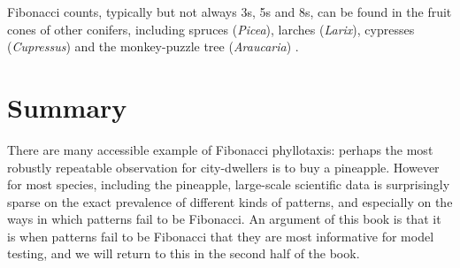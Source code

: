 Fibonacci counts, typically but not always 3s, 5s and 8s, can be found in the fruit cones of other conifers, including spruces (\textit{Picea}), larches (\textit{Larix}),  cypresses (\textit{Cupressus}) \cite{fierzAberrantPhyllotacticPatterns2015} and the monkey-puzzle tree (\textit{Araucaria}) \cite{churchRelationPhyllotaxisMechanical1904}. 




 \section{Summary}
 There are many accessible example of Fibonacci phyllotaxis: perhaps the most robustly repeatable observation for city-dwellers is to buy a pineapple. However for most species, including the pineapple,  large-scale scientific data is surprisingly sparse on the exact prevalence of different kinds of patterns, and especially on the ways in which patterns fail to be Fibonacci. An argument of this book is that it is when patterns fail to be Fibonacci that they are most informative for model testing, and we will return to this in the second half of the book. 
